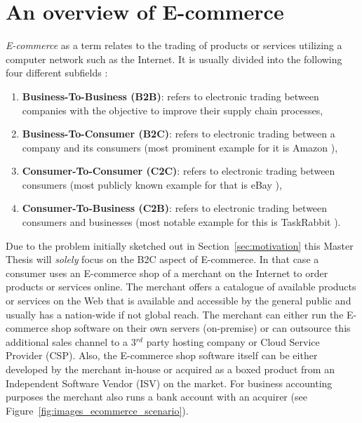
\section{An overview of \gls{E-commerce}}
\label{sec:e_commerce_scenario}

\emph{\gls{E-commerce}} as a term relates to the trading of products or services utilizing a computer network such as the Internet. It is usually divided into the following four different subfields \citep{sen2015study}:\@

\begin{enumerate}
  \item \textbf{Business-To-Business (\gls{B2B})}: refers to electronic trading between companies with the objective to improve their supply chain processes,
  \item \textbf{Business-To-Consumer (\gls{B2C})}: refers to electronic trading between a company and its consumers (most prominent example for it is Amazon \citep{Amazon.com}),
  \item \textbf{Consumer-To-Consumer (\gls{C2C})}: refers to electronic trading between consumers (most publicly known example for that is eBay \citep{eBayInc}),
  \item \textbf{Consumer-To-Business (\gls{C2B})}: refers to electronic trading between consumers and businesses (most notable example for this is TaskRabbit \citep{TaskRabbit}).
\end{enumerate}

Due to the problem initially sketched out in Section~\ref{sec:motivation} this Master Thesis will \emph{solely} focus on the \gls{B2C} aspect of \gls{E-commerce}. In that case a consumer uses an \gls{E-commerce} shop of a merchant on the Internet to order products or services online. The merchant offers a catalogue of available products or services on the Web that is available and accessible by the general public and usually has a nation-wide if not global reach. The merchant can either run the \gls{E-commerce} shop software on their own servers (on-premise) or can outsource this additional sales channel to a 3$^{rd}$ party hosting company or Cloud Service Provider (\gls{CSP}). Also, the \gls{E-commerce} shop software itself can be either developed by the merchant in-house or acquired as a boxed product from an Independent Software Vendor (\gls{ISV}) on the market. For business accounting purposes the merchant also runs a bank account with an acquirer (see Figure~\ref{fig:images_ecommerce_scenario}). \\

